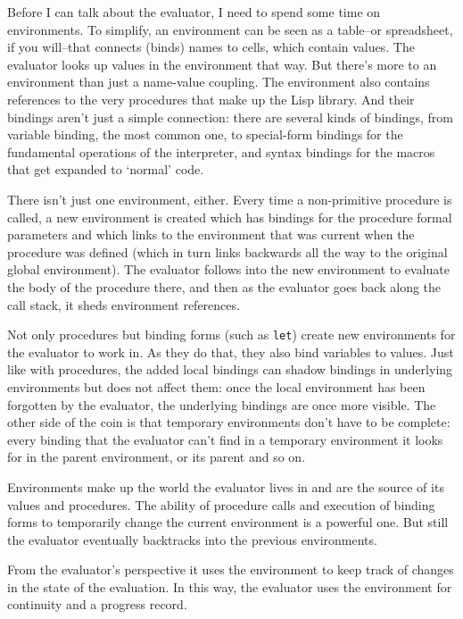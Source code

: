 \documentclass[twoside]{report}
\begin{document}
Before I can talk about the evaluator, I need to spend some time on environments. To simplify, an environment can be seen as a table--or spreadsheet, if you will--that connects (binds) names to cells, which contain values. The evaluator looks up values in the environment that way. But there's more to an environment than just a name-value coupling. The environment also contains references to the very procedures that make up the Lisp library. And their bindings aren't just a simple connection: there are several kinds of bindings, from variable binding, the most common one, to special-form bindings for the fundamental operations of the interpreter, and syntax bindings for the macros that get expanded to `normal' code.

There isn't just one environment, either. Every time a non-primitive procedure is called, a new environment is created which has bindings for the procedure formal parameters and which links to the environment that was current when the procedure was defined (which in turn links backwards all the way to the original global environment). The evaluator follows into the new environment to evaluate the body of the procedure there, and then as the evaluator goes back along the call stack, it sheds environment references.

Not only procedures but binding forms (such as \texttt{let}) create new environments for the evaluator to work in. As they do that, they also bind variables to values. Just like with procedures, the added local bindings can shadow bindings in underlying environments but does not affect them: once the local environment has been forgotten by the evaluator, the underlying bindings are once more visible. The other side of the coin is that temporary environments don't have to be complete: every binding that the evaluator can't find in a temporary environment it looks for in the parent environment, or its parent and so on.

Environments make up the world the evaluator lives in and are the source of its values and procedures. The ability of procedure calls and execution of binding forms to temporarily change the current environment is a powerful one. But still the evaluator eventually backtracks into the previous environments.

From the evaluator's perspective it uses the environment to keep track of changes in the state of the evaluation. In this way, the evaluator uses the environment for continuity and a progress record.
\end{document}
